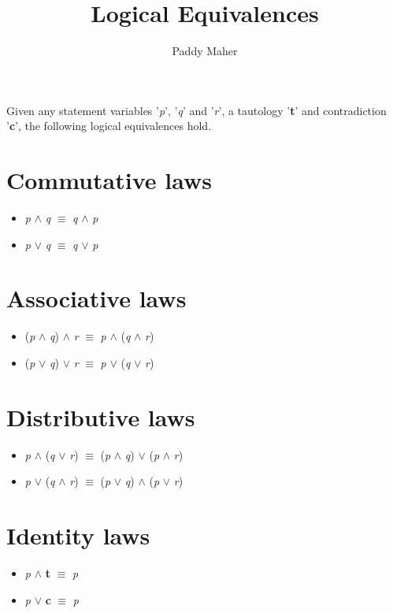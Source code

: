 \documentclass{article}
\title{Logical Equivalences}
\author{Paddy Maher}
\begin{document}
\maketitle

Given any statement variables '\textit{p}', '\textit{q}' and '\textit{r}', a tautology '\textbf{t}' and contradiction '\textbf{c}', the following
logical equivalences hold.


\section{Commutative laws}
\begin{itemize} 
\item \textit{p} $\wedge$ \textit{q} $\equiv$ \textit{q} $\wedge$ \textit{p}
\item \textit{p} $\lor$ \textit{q} $\equiv$ \textit{q} $\lor$ \textit{p}
\end{itemize}

\section{Associative laws}
\begin{itemize}
\item (\textit{p} $\wedge$ \textit{q}) $\wedge$ \textit{r} $\equiv$ \textit{p} $\wedge$ (\textit{q} $\wedge$ \textit{r})
\item (\textit{p} $\lor$ \textit{q}) $\lor$ \textit{r} $\equiv$ \textit{p} $\lor$ (\textit{q} $\lor$ \textit{r})
\end{itemize}

\section{Distributive laws}
\begin{itemize}
\item \textit{p} $\wedge$ (\textit{q} $\lor$ \textit{r}) $\equiv$ (\textit{p} $\wedge$ \textit{q}) $\lor$ (\textit{p} $\wedge$ \textit{r})
\item \textit{p} $\lor$ (\textit{q} $\wedge$ \textit{r}) $\equiv$ (\textit{p} $\lor$ \textit{q}) $\wedge$ (\textit{p} $\lor$ \textit{r})
\end{itemize}

\section{Identity laws}
\begin{itemize}
\item \textit{p} $\wedge$ \textbf{t} $\equiv$ \textit{p}
\item \textit{p} $\lor$ \textbf{c} $\equiv$ \textit{p}
\end{itemize}
\end{document}
